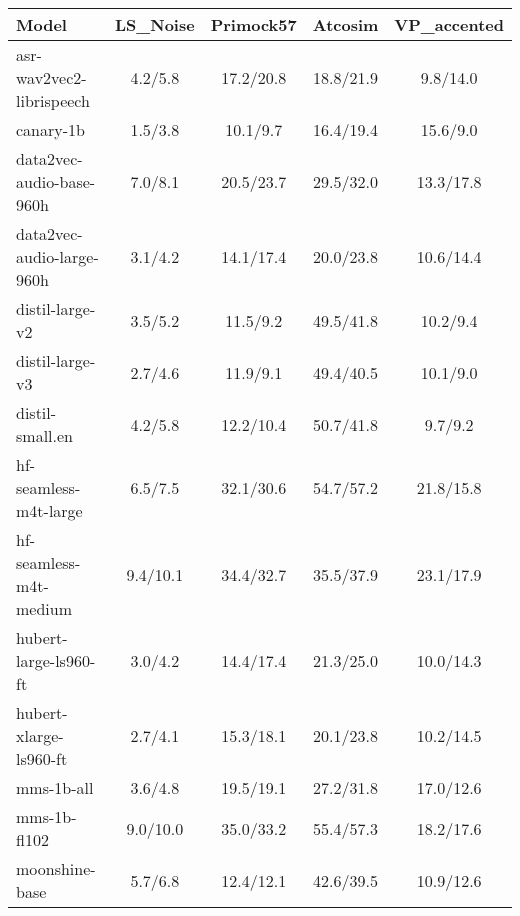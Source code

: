 \begin{table*}[ht]
\centering
\begin{tabular}{lcccc}
\toprule
Model                                     & LS\_Noise & Primock57 & Atcosim & VP\_accented \\

\midrule
asr-wav2vec2-librispeech                  & 4.2/5.8             & 17.2/20.8           & 18.8/21.9         & 9.8/14.0               \\
canary-1b                                 & 1.5/3.8             & 10.1/9.7            & 16.4/19.4         & 15.6/9.0               \\
data2vec-audio-base-960h                  & 7.0/8.1             & 20.5/23.7           & 29.5/32.0         & 13.3/17.8              \\
data2vec-audio-large-960h                 & 3.1/4.2             & 14.1/17.4           & 20.0/23.8         & 10.6/14.4              \\
distil-large-v2                           & 3.5/5.2             & 11.5/9.2            & 49.5/41.8         & 10.2/9.4               \\
distil-large-v3                           & 2.7/4.6             & 11.9/9.1            & 49.4/40.5         & 10.1/9.0               \\
distil-small.en                           & 4.2/5.8             & 12.2/10.4           & 50.7/41.8         & 9.7/9.2                \\
hf-seamless-m4t-large                     & 6.5/7.5             & 32.1/30.6           & 54.7/57.2         & 21.8/15.8              \\
hf-seamless-m4t-medium                    & 9.4/10.1            & 34.4/32.7           & 35.5/37.9         & 23.1/17.9              \\
hubert-large-ls960-ft                     & 3.0/4.2             & 14.4/17.4           & 21.3/25.0         & 10.0/14.3              \\
hubert-xlarge-ls960-ft                    & 2.7/4.1             & 15.3/18.1           & 20.1/23.8         & 10.2/14.5              \\
mms-1b-all                                & 3.6/4.8             & 19.5/19.1           & 27.2/31.8         & 17.0/12.6              \\
mms-1b-fl102                              & 9.0/10.0            & 35.0/33.2           & 55.4/57.3         & 18.2/17.6              \\
moonshine-base                            & 5.7/6.8             & 12.4/12.1           & 42.6/39.5         & 10.9/12.6              \\

\end{tabular}
\end{table*}
